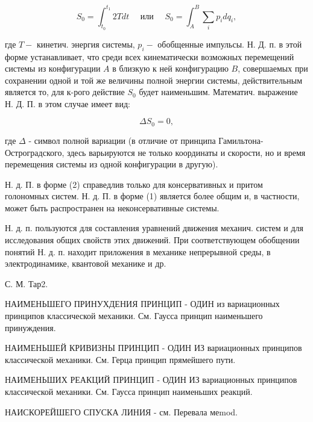 \documentclass[10pt]{article}
\begin{document}
\[

S_{0}=\int_{t_{0}}^{t_{1}} 2 T d t \quad \text { или } \quad S_{0}=\int_{A}^{B} \sum_{i} p_{i} d q_{i},

\]



где $T-$ кинетич. энергия системы, $p_{i}-$ обобщенные импульсы. Н. Д. п. в этой форме устанавливает, что среди всех кинематически возможных перемещений системы из конфигурации $A$ в близкую к ней конфигурацию $B$, совершаемых при сохранении одной и той же величины полной энергии системы, действительным является то, для к-рого действие $S_{0}$ будет наименьшим. Математич. выражение Н. Д. П. в этом случае имеет вид:



\[

\Delta S_{0}=0,

\]



где $\Delta$ - символ полной вариации (в отличие от принципа Гамильтона-Остроградского, здесь варьируются не только координаты и скорости, но и время перемещения системы из одной конфигурации в другую).



Н. д. П. в форме (2) справедлив только для консервативных и притом голономных систем. Н. д. П. в форме (1) является более общим и, в частности, может быть распространен на неконсервативные системы.



Н. д. п. пользуются для составления уравнений движения механич. систем и для исследования общих свойств этих движений. При соответствующем обобщении понятий Н. д. п. находит приложения в механике непрерывной среды, в электродинамике, квантовой механике и др.



С. М. Тар2.



НАИМЕНЬШЕГО ПРИНУХДЕНИЯ ПРИНЦИП - ОДИН из вариационных принципов классической механики. См. Гаусса принцип наименьшего принуждения.



НАИМЕНЬШЕЙ КРИВИЗНЫ ПРИНЦИП - ОДИН ИЗ вариационных принципов классической механики. См. Герца принцип прямейшего пути.



НАИМЕНЬШИХ РЕАКЦИЙ ПРИНЦИП - ОДИН ИЗ вариационных принципов классической механики. См. Гаусса принцип наименьших реакций.



НАИСКОРЕЙШЕГО СПУСКА ЛИНИЯ - см. Перевала меmod.
\end{document}
